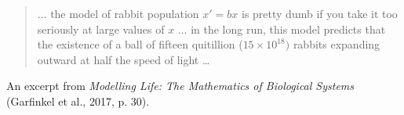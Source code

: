 \documentclass[14pt]{beamer}
\begin{document}
\begin{frame}
  \small

  \begin{quote}
    ... the model of rabbit population \(x' = bx\) is pretty dumb if you take it too seriously at large values of \(x\) ... in the long run, this model predicts that the existence of a ball of fifteen quitillion (\(15 \times 10^{18})\) rabbits expanding outward at half the speed of light \ldots{}
  \end{quote}

  An excerpt from \emph{Modelling Life: The Mathematics of Biological Systems} (Garfinkel et al., 2017, p. 30).
\end{frame}
\end{document}
